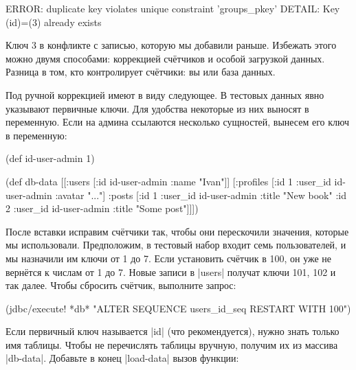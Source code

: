 
\begin{english}
  \begin{text}
ERROR: duplicate key violates unique constraint 'groups_pkey'
DETAIL: Key (id)=(3) already exists
  \end{text}
\end{english}

Ключ 3 в конфликте с записью, которую мы добавили раньше. Избежать этого можно
двумя способами: коррекцией счётчиков и особой загрузкой данных. Разница в том,
кто контролирует счётчики: вы или база данных.

Под ручной коррекцией имеют в виду следующее. В тестовых данных явно указывают
первичные ключи. Для удобства некоторые из них выносят в переменную. Если на
админа ссылаются несколько сущностей, вынесем его ключ в переменную:

\begin{english}
  \begin{clojure}
(def id-user-admin 1)

(def db-data
  [[:users [{:id id-user-admin :name "Ivan"}]]
   [:profiles [{:id 1 :user_id id-user-admin :avatar "..."}]
    :posts [{:id 1 :user_id id-user-admin :title "New book"}
            {:id 2 :user_id id-user-admin :title "Some post"}]]])
  \end{clojure}
\end{english}


После вставки исправим счётчики так, чтобы они перескочили значения, которые мы
использовали. Предположим, в тестовый набор входит семь пользователей, и мы
назначили им ключи от 1 до 7. Если установить счётчик в 100, он уже не вернётся
к числам от 1 до 7. Новые записи в \spverb|users| получат ключи 101, 102 и так
далее. Чтобы сбросить счётчик, выполните запрос:

\begin{english}
  \begin{clojure}
(jdbc/execute! *db*
  "ALTER SEQUENCE users_id_seq RESTART WITH 100")
  \end{clojure}
\end{english}

Если первичный ключ называется \spverb|id| (что рекомендуется), нужно знать
только имя таблицы. Чтобы не перечислять таблицы вручную, получим их из массива
\spverb|db-data|. Добавьте в конец \spverb|load-data| вызов функции:


